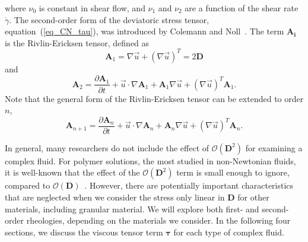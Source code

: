 where $\nu_0$ is constant in shear flow, and $\nu_1$ and $\nu_2$ are a function of the shear rate $\dot{\gamma}$.
The second-order form of the deviatoric stress tensor, equation~(\ref{eq_CN_tau}), was introduced by Colemann and Noll~\cite{coleman_approximation_1960}.
The term $\bm{A_i}$ is the Rivlin-Ericksen tensor, defined as
\begin{equation}
   {\bm A_1}  = \nabla \vec{u} +  \left( \nabla \vec{u} \right)^T = 2 \bm{D} 
   \label{eq_A1}
\end{equation}
and 
\begin{equation}
   \boldsymbol{A}_2
   =\frac{\partial \boldsymbol{A}_1}{\partial t} + \vec{u} \cdot \nabla \boldsymbol{A}_1+\boldsymbol{A}_1 \nabla \vec{u}+ \left(\nabla \vec{u} \right)^T \boldsymbol{A}_1.
   \label{eq_A2}
\end{equation}
Note that the general form of the Rivlin-Ericksen tensor can be extended to order $n$,  
\begin{equation}
  \boldsymbol{A}_{n+1}
  =\frac{\partial \boldsymbol{A}_{n}}{\partial t} + \vec{u} \cdot \nabla \boldsymbol{A}_n+\boldsymbol{A}_n \nabla \vec{u}+ \left(\nabla \vec{u} \right)^T \boldsymbol{A}_n.
\end{equation}
\par
In general, many researchers do not include the effect of $\mathcal{O}\left( \bm{D}^2 \right)$ for examining a complex fluid. For polymer solutions, the most studied in non-Newtonian fluids, it is well-known that the effect of the $\mathcal{O}\left( \bm{D}^2 \right)$ term is small enough to ignore, compared to  $\mathcal{O}\left( \bm{D} \right)$~\cite{bird_dynamics_1987}. 
However, there are potentially important characteristics that are neglected when we consider the stress only linear in $\boldsymbol{D}$ for other materials, including granular material. We will explore both first- and second-order rheologies, depending on the materials we consider. 
In the following four sections, we discuss the viscous tensor term $\bm \tau$ for each type of complex fluid. 

